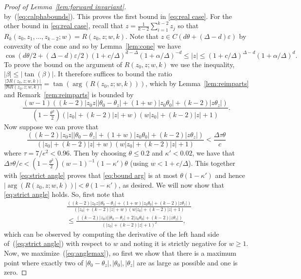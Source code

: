 \documentclass[10pt,a4paper]{article}
\theoremstyle{definition}
\newcommand*{\eps}{\varepsilon}
\begin{document}
\begin{proof}[Proof of Lemma~\ref{lem:forward invariant}]
\[\]
by~(\ref{eq:calphabounds}). This proves the first bound in \eqref{eq:real case}.
%
%
%
%
%
For the other bound in \eqref{eq:real case}, recall that
 $z=\frac{1}{k-2}\sum_{i=1}^{k-2}z_j$ so that
 $R_k(z_0,z_1,\ldots,z_{k-2};w)=R(z_0,z;w,k)$. 
%
Note that $z\in C(d\theta+(\Delta-d)\eps)$ by convexity of the cone and so by Lemma~\ref{lem:cone} we have
\[
\cos(d\theta/2+(\Delta-d)\eps/2)(1+c/\Delta)^{d-\Delta}(1+\alpha/\Delta)^{-d}\leq |z|\leq (1+c/\Delta)^{\Delta-d}(1+\alpha/\Delta)^{d}.
\]
To prove the bound on the argument of $R(z_0,z;w,k)$ we use the inequality, $|\beta|\leq |\tan(\beta)|$. It therefore suffices to bound the ratio $\frac{|\Im R(z_0,z;w,k)|}{|\Re R(z_0,z;w,k)|} = \tan(\arg(R(z_0,z;w,k)))$, which by Lemma~\ref{lem:reimparts} and Remark~\ref{rem:reimparts} is bounded by
 \begin{equation}\label{eq:bound arg}
  \frac{(w-1)\left((k-2)|z_0z||\theta_0-\theta_z|+(1+w)|z_0 \theta_0|+(k-2)|z\theta_z|\right)}
 {(1 - \frac{\theta^2}{2})(|z_0|+(k-2)|z|+w)(w|z_0|+(k-2)|z|+1)}.  
\end{equation}
Now suppose we can prove that
\begin{equation}\label{eq:strict angle}
  \frac{\left((k-2)|z_0z||\theta_0-\theta_z|+(1+w)|z_0 \theta_0|+(k-2)|z\theta_z|\right)}
 {(|z_0|+(k-2)|z|+w)(w|z_0|+(k-2)|z|+1)}
  < \frac{\Delta \tau \theta}{c} 
\end{equation}
where $\tau  = 7/e^2 < 0.96$.
%
Then by choosing $\theta \leq 0.2$ and $\kappa' < 0.02$, we have that $\Delta \tau \theta /c < (1 - \frac{\theta^2}{2})(w-1)^{-1}(1 - \kappa')\theta$ (using $w < 1 + c/\Delta$). This together with \eqref{eq:strict angle}  proves that \eqref{eq:bound arg} is at most $\theta(1-\kappa')$ and hence $|\arg(R(z_0,z;w,k))|< \theta(1-\kappa')$, as desired.
%
We will now show that \eqref{eq:strict angle} holds.
So, first note that
\begin{align}
 \nonumber & \frac{\left((k-2)|z_0z||\theta_0-\theta_z|+(1+w)|z_0 \theta_0|+(k-2)|z\theta_z|\right)}
 {(|z_0|+(k-2)|z|+w)(w|z_0|+(k-2)|z|+1)} \\
 & \leq \frac{\left((k-2)|z_0z||\theta_0-\theta_z|+2|z_0\theta_0|+(k-2)|z\theta_z|\right)}{(|z_0|+(k-2)|z|+1)^2}, \label{eq:anglemax}
\end{align}
which can be observed by computing the derivative of the left hand side of~(\ref{eq:strict angle}) with respect to $w$ and noting it is strictly negative for $w \geq 1$.
Now, we maximize~(\ref{eq:anglemax}), so first we show that there is a maximum point where exactly two of $|\theta_0-\theta_z|,|\theta_0|,|\theta_z|$ are as large as possible and one is zero.

\end{proof}
\end{document}
